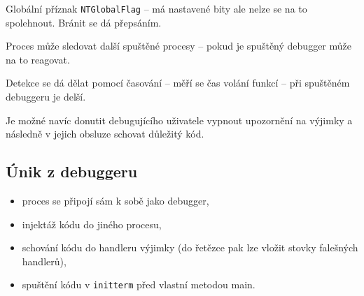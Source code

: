 Globální příznak \texttt{NTGlobalFlag} -- má nastavené bity ale nelze se na to spolehnout.
Bránit se dá přepsáním.

Proces může sledovat další spuštěné procesy -- pokud je spuštěný debugger může na to reagovat.

Detekce se dá dělat pomocí časování -- měří se čas volání funkcí -- při spuštěném debuggeru je delší.

Je možné navíc donutit debugujícího uživatele vypnout upozornění na výjimky a následně v jejich obsluze schovat důležitý kód.

\subsection*{Únik z debuggeru}

\begin{itemize}
    \item proces se připojí sám k sobě jako debugger,
    \item injektáž kódu do jiného procesu,
    \item schování kódu do handleru výjimky (do řetězce pak lze vložit stovky falešných handlerů),
    \item spuštění kódu v \texttt{initterm} před vlastní metodou main.
\end{itemize}
